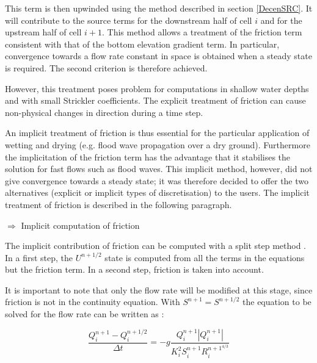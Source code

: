 \vspace{0.5cm}

This term is then upwinded using the method described in section \ref{DecenSRC}. It will contribute to the source terms for the downstream half of cell $i$ and for the upstream half of cell $i+1$.
This method allows a treatment of the friction term consistent with that of the bottom elevation gradient term. In particular, convergence towards a flow rate constant in space is obtained when a steady state is required. The second criterion is therefore achieved.

\vspace{0.5cm}

However, this treatment poses problem for computations in shallow water depths and with small Strickler coefficients. The explicit treatment of friction can cause non-physical changes in direction during a time step.

\vspace{0.5cm}

An implicit treatment of friction is thus essential for the particular application of wetting and drying (e.g. flood wave propagation over a dry ground). Furthermore the implicitation of the friction term has the advantage that it stabilises the solution for fast flows such as flood waves. This implicit method, however, did not give convergence towards a steady state; it was therefore decided to offer the two alternatives (explicit or implicit types of discretisation) to the users. The implicit treatment of friction is described in the following paragraph.

\vspace{0.5cm}

$\Longrightarrow$ Implicit computation of friction

\vspace{0.5cm}

The implicit contribution of friction can be computed with a split step method \cite{PAQUIER95}. In a first step, the $U^{n+1/2}$ state is computed from all the terms in the equations but the friction term. In a second step, friction is taken into account.

\vspace{0.5cm}

It is important to note that only the flow rate will be modified at this stage, since friction is not in the continuity equation. With $S^{n+1} = S^{n+1/2}$ the equation to be solved for the flow rate can be written as :

\begin{equation}
 \frac{Q_{i}^{n+1}-Q_{i}^{n+1/2}}{\Delta t} = -g \frac{Q_{i}^{n+1}|Q_{i}^{n+1}|}{K_{i}^2 S_{i}^{n+1} R_{i}^{n+1^{4/3}}}
\end{equation}

